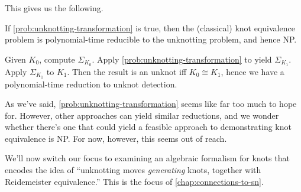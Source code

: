 This gives us the following.
\begin{proposition}
  If \cref{prob:unknotting-transformation} is true, then the
  (classical) knot equivalence problem is polynomial-time reducible to
  the unknotting problem, and hence NP.
\end{proposition}
\begin{sproof}[Sketch]
  Given $K_0$, compute $\Sigma_{K_0}$. Apply
  \cref{prob:unknotting-transformation} to yield $\Sigma_{K_1}$. Apply
  $\Sigma_{K_1}$ to $K_1$. Then the result is an unknot iff $K_0 \cong
  K_1$, hence we have a polynomial-time reduction to unknot detection.
\end{sproof}
As we've said, \cref{prob:unknotting-transformation} seems like far
too much to hope for. However, other approaches can yield similar
reductions, and we wonder whether there's one that could yield a
feasible approach to demonstrating knot equivalence is NP. For now,
however, this seems out of reach.

We'll now switch our focus to examining an algebraic formalism for
knots that encodes the idea of ``unknotting moves \emph{generating}
knots, together with Reidemeister equivalence.'' This is the focus of
\cref{chap:connections-to-sn}.









